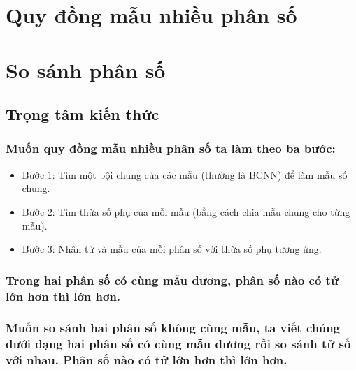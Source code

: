 \section{Quy đồng mẫu nhiều phân số}
\section{So sánh phân số}
\subsection{Trọng tâm kiến thức}
\subsubsection{Muốn quy đồng mẫu nhiều phân số ta làm theo ba bước:}
	\begin{itemize}
		\item Bước 1: Tìm một bội chung của các mẫu (thường là BCNN) để làm mẫu số chung.
		\item Bước 2: Tìm thừa số phụ của mỗi mẫu (bằng cách chia mẫu chung cho từng mẫu).
		\item Bước 3: Nhân tử và mẫu của mỗi phân số với thừa số phụ tương ứng.
	\end{itemize}
	\subsubsection{Trong hai phân số có cùng mẫu dương, phân số nào có tử lớn hơn thì lớn hơn.}
	\subsubsection{Muốn so sánh hai phân số không cùng mẫu, ta viết chúng dưới dạng hai phân số có cùng mẫu dương rồi so sánh tử số với nhau. Phân số nào có tử lớn hơn thì lớn hơn.}
